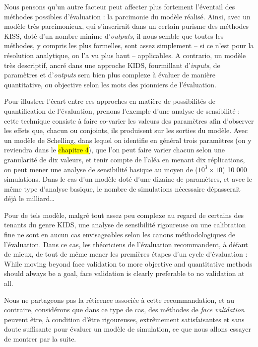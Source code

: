 Nous pensons qu'un autre facteur peut affecter plus fortement l'éventail des méthodes possibles d'évaluation : la parcimonie du modèle réalisé.
Ainsi, avec un modèle très parcimonieux, qui s'inscrirait dans un certain purisme des méthodes \og KISS\fg{}, doté d'un nombre minime d'\textit{outputs}, il nous semble que toutes les méthodes, y compris les plus formelles, sont assez simplement -- si ce n'est pour la résolution analytique, on l'a vu plus haut -- applicables.
A contrario, un modèle très descriptif, ancré dans une approche \og KIDS\fg{}, fourmillant d'\textit{inputs}, de paramètres et d'\textit{outputs} sera bien plus complexe à évaluer de manière quantitative, ou \og objective\fg{} selon les mots des pionniers de l'évaluation.

Pour illustrer l'écart entre ces approches en matière de possibilités de quantification de l'évaluation, prenons l'exemple d'une analyse de sensibilité :
cette technique consiste à faire co-varier les valeurs des paramètres afin d'observer les effets que, chacun ou conjoints, ils produisent sur les sorties du modèle.
Avec un modèle de Schelling, dans lequel on identifie en général trois paramètres (on y reviendra dans le \hl{chapitre 4}), que l'on peut faire varier chacun selon une granularité de dix valeurs, et tenir compte de l'aléa en menant dix réplications, on peut mener une analyse de sensibilité basique au moyen de ($10^3 \times 10$) 10 000 simulations.
Dans le cas d'un modèle doté d'une dizaine de paramètres, et avec le même type d'analyse basique, le nombre de simulations nécessaire dépasserait déjà le milliard\ldots

Pour de tels modèle, malgré tout assez peu complexe au regard de certains des tenants du genre KIDS, une analyse de sensibilité rigoureuse ou une calibration fine ne sont en aucun cas envisageables selon les canons méthodologiques de l'évaluation.
Dans ce cas, les théoriciens de l'évaluation recommandent, à défaut de mieux, de tout de même mener les premières étapes d'un cycle d'évaluation \autocite[342]{petty2010verification} : \og While moving beyond face validation to more objective and quantitative methods should always be a goal, face validation is clearly preferable to no validation at all.\fg{}

Nous ne partageons pas la réticence associée à cette recommandation, et au contraire, considérons que dans ce type de cas, des méthodes de \og \textit{face validation}\fg{} peuvent être, à condition d'être rigoureuses, extrêmement satisfaisantes et sans doute suffisante pour évaluer un modèle de simulation, ce que nous allons essayer de montrer par la suite.

